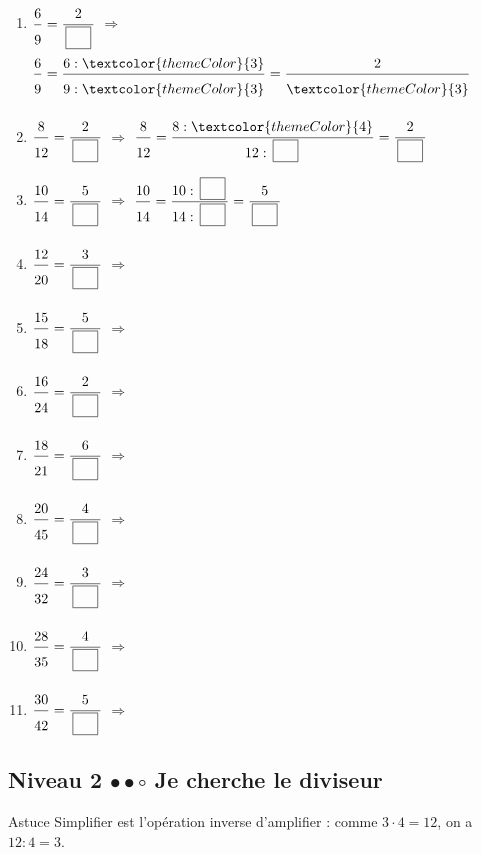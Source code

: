 \begin{enumerate}[leftmargin=*,align=parleft, label=\alph*), itemsep=9pt]
\item $\FA{6}{9}=\FA{2}{\CaseC}$ \quad $\Longrightarrow$ \quad $\FA{6}{9}=\FA{6 : \textcolor{themeColor}{3}}{9 : \textcolor{themeColor}{3}}=\FA{2}{\textcolor{themeColor}{3}}$
\item $\FA{8}{12}=\FA{2}{\CaseC}$ \quad $\Longrightarrow$ \quad $\FA{8}{12}=\FA{8 : \textcolor{themeColor}{4}}{12 : \CaseC}=\FA{2}{\CaseC}$
\item $\FA{10}{14}=\FA{5}{\CaseC}$ \quad $\Longrightarrow$ \quad $\FA{10}{14}=\FA{10 : \CaseC}{14 : \CaseC}=\FA{5}{\CaseC}$
\item $\FA{12}{20}=\FA{3}{\CaseC}$ \quad $\Longrightarrow$
\item $\FA{15}{18}=\FA{5}{\CaseC}$ \quad $\Longrightarrow$
\item $\FA{16}{24}=\FA{2}{\CaseC}$ \quad $\Longrightarrow$
\item $\FA{18}{21}=\FA{6}{\CaseC}$ \quad $\Longrightarrow$
\item $\FA{20}{45}=\FA{4}{\CaseC}$ \quad $\Longrightarrow$
\item $\FA{24}{32}=\FA{3}{\CaseC}$ \quad $\Longrightarrow$
\item $\FA{28}{35}=\FA{4}{\CaseC}$ \quad $\Longrightarrow$
\item $\FA{30}{42}=\FA{5}{\CaseC}$ \quad $\Longrightarrow$
\end{enumerate}
 
\vspace{10pt}
\subsection{Niveau 2 \quad $\bullet\bullet\circ$ \quad Je cherche le diviseur}
 

\begin{astuce}{Astuce}
Simplifier est l'opération inverse d'amplifier : comme $3 \cdot 4 = 12$, on a $12 : 4 = 3$.
\end{astuce}
 
